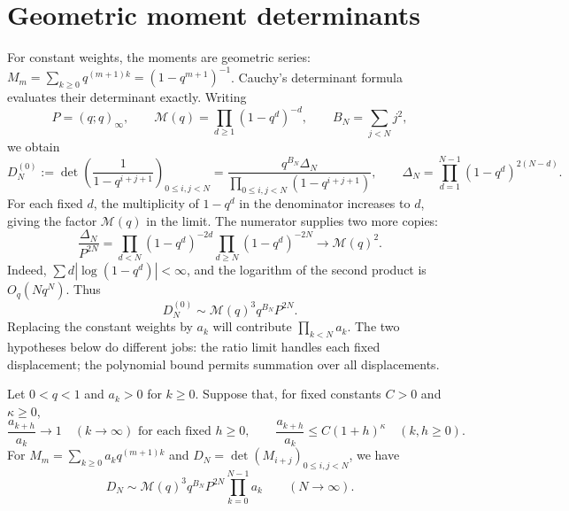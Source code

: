 \documentclass[11pt]{article}
\begin{document}
\section{Geometric moment determinants}\label{sec:geometric-moments}

For constant weights, the moments are geometric series:
$M_m=\sum_{k\ge0}q^{(m+1)k}=(1-q^{m+1})^{-1}$.
Cauchy's determinant formula evaluates their determinant exactly.
Writing
\[
 P=(q;q)_\infty,\qquad
 \mathcal M(q)=\prod_{d\ge1}(1-q^d)^{-d},\qquad
 B_N=\sum_{j<N}j^2,
\]
we obtain
\begin{equation}\label{eq:cauchy-model}
 D_N^{(0)}:=\det\left(\frac1{1-q^{i+j+1}}\right)_{0\le i,j<N}
 =\frac{q^{B_N}\Delta_N}{\prod_{0\le i,j<N}(1-q^{i+j+1})},
 \qquad
 \Delta_N=\prod_{d=1}^{N-1}(1-q^d)^{2(N-d)}.
\end{equation}
For each fixed $d$, the multiplicity of $1-q^d$ in the denominator
increases to $d$, giving the factor $\mathcal M(q)$ in the limit.
The numerator supplies two more copies:
\[
 \frac{\Delta_N}{P^{2N}}
 =\prod_{d<N}(1-q^d)^{-2d}\prod_{d\ge N}(1-q^d)^{-2N}
 \longrightarrow\mathcal M(q)^2.
\]
Indeed, $\sum d|\log(1-q^d)|<\infty$, and the logarithm of the
second product is $O_q(Nq^N)$. Thus
\begin{equation}\label{eq:cauchy-model-limit}
 D_N^{(0)}\sim\mathcal M(q)^3q^{B_N}P^{2N}.
\end{equation}
Replacing the constant weights by $a_k$ will contribute
$\prod_{k<N}a_k$. The two hypotheses below do different jobs:
the ratio limit handles each fixed displacement; the polynomial
bound permits summation over all displacements.

\begin{theorem}\label{thm:geometric-moments}
Let $0<q<1$ and $a_k>0$ for $k\ge0$. Suppose that, for fixed
constants $C>0$ and $\kappa\ge0$,
\begin{equation}\label{eq:automatic-shift-bound}
 \frac{a_{k+h}}{a_k}\longrightarrow1\quad(k\to\infty)
 \text{ for each fixed }h\ge0,
 \qquad
 \frac{a_{k+h}}{a_k}\le C(1+h)^\kappa\quad(k,h\ge0).
\end{equation}
For $M_m=\sum_{k\ge0}a_kq^{(m+1)k}$ and
$D_N=\det(M_{i+j})_{0\le i,j<N}$, we have
\begin{equation}\label{eq:geometric-limit}
 D_N\sim\mathcal M(q)^3q^{B_N}P^{2N}\prod_{k=0}^{N-1}a_k
 \qquad(N\to\infty).
\end{equation}
\end{theorem}
\end{document}
